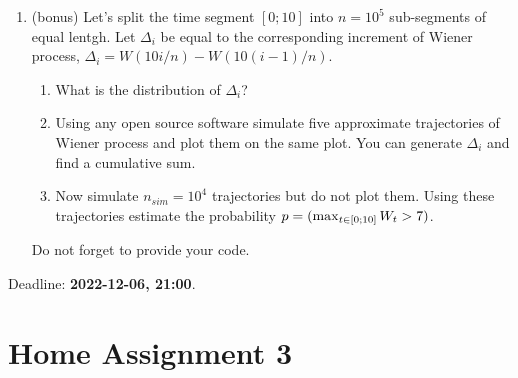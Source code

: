 \documentclass[12pt]{article}
\let\P\relax
\DeclareMathOperator{\P}{\mathbb{P}}
\begin{document}
\begin{enumerate}
  \item (bonus) Let's split the time segment $[0;10]$ into $n=10^5$ sub-segments of equal lentgh. 
  Let $\Delta_i$ be equal to the corresponding increment of Wiener process, 
  $\Delta_i = W(10i/n) - W(10(i-1)/n)$. 
   \begin{enumerate}
     \item What is the distribution of $\Delta_i$?
     \item Using any open source software simulate five approximate trajectories of Wiener process and plot them 
     on the same plot. You can generate $\Delta_i$ and find a cumulative sum. 
     \item Now simulate $n_{sim} = 10^4$ trajectories but do not plot them. 
     Using these trajectories estimate the probability $p = \P(\max_{t \in [0;10]}W_t > 7)$. 
   \end{enumerate}
   
   Do not forget to provide your code. 
 

\end{enumerate}


Deadline: \textbf{2022-12-06, 21:00}. 



\newpage

\section*{Home Assignment 3}
\end{document}
